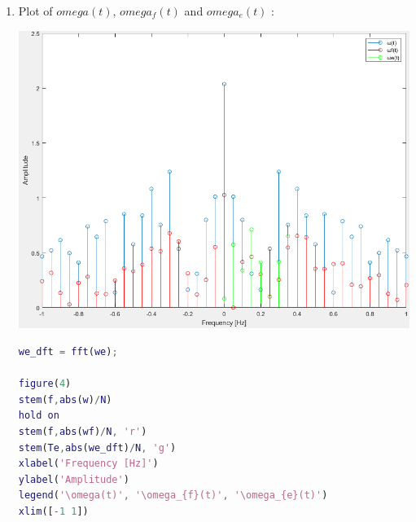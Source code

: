 \documentclass[a4paper,12pt]{article}
\begin{document}
\begin{enumerate}[label={\color{blue}\arabic*)}]
\begin{multicols}{2}
        \columnbreak

        \begin{lstlisting}[style=Matlab-editor,language=Matlab, basicstyle=\small\ttfamily]
figure(3)
plot(t1,wf)
xlim([10 12])
xlabel('Time [sec]')
ylabel('Angular Velocity [rad/sec]')
grid on
hold on
stem(Te,abs(we), 'r')
legend(' \omega_{f}(t)','\omega_{e}(t)','Fontsize',14)
        \end{lstlisting}
    \end{multicols}

    We can see that \(omega_e(t)\) is not visible because it is only display between 0 and 0.35 sec.

    \item
    Plot of \(omega(t)\), \(omega_f(t)\) and \(omega_e(t)\) :
    \begin{multicols}{2}
        \begin{flushleft}
            \includegraphics[width=1\linewidth]{Images/w_wf_weDFT.png}
            \label{Figure9}
        \end{flushleft}

        \columnbreak

        \begin{lstlisting}[style=Matlab-editor,language=Matlab, basicstyle=\small\ttfamily]
we_dft = fft(we);

figure(4)
stem(f,abs(w)/N)
hold on
stem(f,abs(wf)/N, 'r')
stem(Te,abs(we_dft)/N, 'g')
xlabel('Frequency [Hz]')
ylabel('Amplitude')
legend('\omega(t)', '\omega_{f}(t)', '\omega_{e}(t)')
xlim([-1 1])
        \end{lstlisting}
    \end{multicols}

\end{enumerate}
\end{document}
